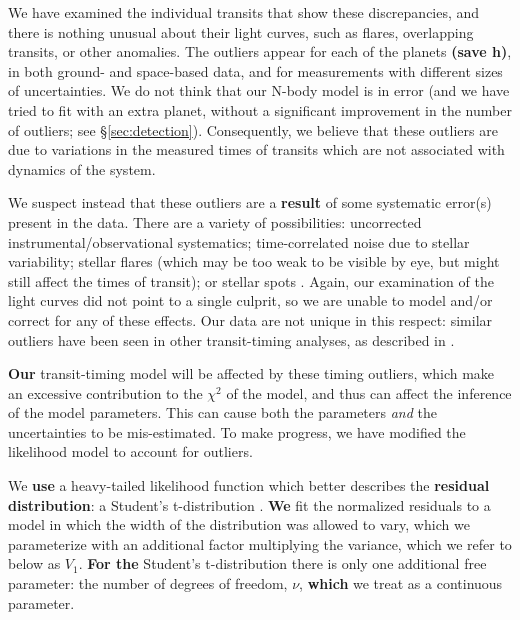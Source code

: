 \documentclass[twocolumn]{aastex63}
\begin{document}
We have examined the individual transits that show these discrepancies,
and there is nothing unusual about their light curves, such as flares,
overlapping transits, or other anomalies.  %
The outliers
appear for each of the planets \textbf{(save h)}, in both ground- and space-based data,
and for measurements with different sizes of uncertainties.  We do
not think that our N-body model is in error (and we have tried to fit
with an extra planet, without a significant improvement in the number
of outliers; see \S \ref{sec:detection}).  Consequently, we believe that these outliers
are due to variations in the measured times of transits which are not
associated with dynamics of the system.

We suspect instead that these outliers
are a \textbf{result} of some systematic error(s) present in the data.  There are a variety
of possibilities:  uncorrected instrumental/observational systematics;
time-correlated noise due to stellar variability;  stellar flares (which
may be too weak to be visible by eye, but might still affect the
times of transit); or stellar spots \textbf{\citep{Oshagh2013,Ioannidis2015}}.
Again, our examination of
the light curves did not point to a single culprit, so we are unable
to model and/or correct for any of these effects.  Our data are not unique in this respect:  similar outliers
have been seen in other transit-timing analyses, as described
in \citet{JontofHutter2016}.

\textbf{Our} transit-timing model will be affected by these
timing outliers, which make an excessive contribution to the
$\chi^2$ of the model, and thus can affect the inference of
the model parameters.   This can cause both the parameters {\it and}
the uncertainties to be mis-estimated.  To make progress, we have
modified the likelihood model to account for outliers.

We \textbf{use} a heavy-tailed likelihood function which
better describes the \textbf{residual distribution}:  %
a Student's t-distribution \citep{JontofHutter2016}.   %
\textbf{We} fit the normalized residuals to a model
in which the width of the distribution was
allowed to vary, which we parameterize with
an additional factor multiplying the variance, which we refer to below as $V_1$.  %
\textbf{For the} Student's t-distribution there is only one
additional free parameter:  the number of
degrees of freedom, $\nu$, \textbf{which} we treat as a continuous parameter.
\end{document}
